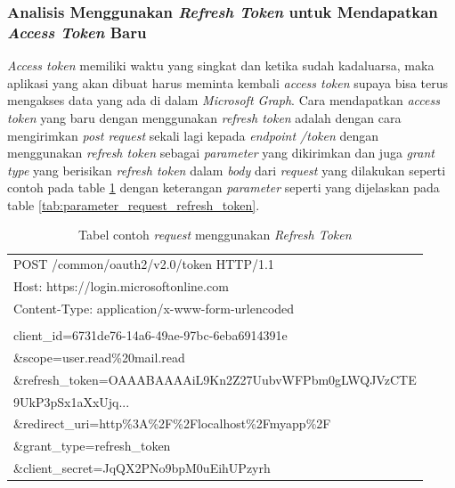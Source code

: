 \subsubsection{Analisis Menggunakan \textit{Refresh Token} untuk Mendapatkan \textit{Access Token} Baru}
\label{analisis_menggunakan_refresh_token}
\textit{Access token} memiliki waktu yang singkat dan ketika sudah kadaluarsa, maka aplikasi yang akan dibuat harus meminta kembali \textit{access token} supaya bisa terus mengakses data yang ada di dalam \textit{Microsoft Graph}. Cara mendapatkan \textit{access token} yang baru dengan menggunakan \textit{refresh token} adalah dengan cara mengirimkan \textit{post request} sekali lagi kepada \textit{endpoint /token} dengan menggunakan \textit{refresh token} sebagai \textit{parameter} yang dikirimkan dan juga \textit{grant type} yang berisikan \textit{refresh token} dalam \textit{body} dari \textit{request} yang dilakukan seperti contoh pada table \ref{tab:contoh_request_refresh_token} dengan keterangan \textit{parameter} seperti yang dijelaskan pada table \ref{tab:parameter_request_refresh_token}. 

\begin{table}[H]
	\centering 
	\caption{Tabel contoh \textit{request} menggunakan \textit{Refresh Token}}
	\label{tab:contoh_request_refresh_token}
	\begin{tabular}{|p{12cm}|}
	\toprule
	POST /common/oauth2/v2.0/token HTTP/1.1\\
Host: https://login.microsoftonline.com\\
Content-Type: application/x-www-form-urlencoded\\
\\
client\_id=6731de76-14a6-49ae-97bc-6eba6914391e\\
\&scope=user.read\%20mail.read\\
\&refresh\_token=OAAABAAAAiL9Kn2Z27UubvWFPbm0gLWQJVzCTE\\
9UkP3pSx1aXxUjq...\\
\&redirect\_uri=http\%3A\%2F\%2Flocalhost\%2Fmyapp\%2F\\
\&grant\_type=refresh\_token\\
\&client\_secret=JqQX2PNo9bpM0uEihUPzyrh\\
	\bottomrule
	\end{tabular}  
\end{table}

